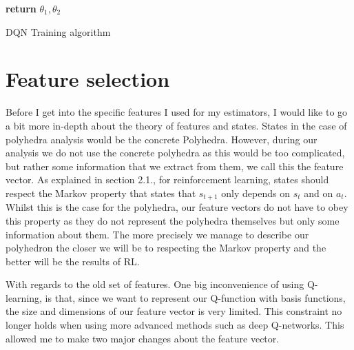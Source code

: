 \begin{center}
\begin{algorithm}[H]
{{     \Indm
     \Indp{}
		\Indm
	\Indp{}\Indm
	\Indp{}
			
    }
    
   }
   \textbf{return} $\theta_1,\theta_2$
    
\caption{DQN Training algorithm}
\end{algorithm}
\end{center}



\section{Feature selection}
Before I get into the specific features I used for my estimators, I would like to go a bit more in-depth about the theory of features and states. States in the case of polyhedra analysis would be the concrete Polyhedra. However, during our analysis we do not use the concrete polyhedra as this would be too complicated, but rather some information that we extract from them, we call this the feature vector. As explained in section 2.1., for reinforcement learning, states should respect the Markov property that states that $s_{t+1}$ only depends on $s_t$ and on $a_t$. Whilst this is the case for the polyhedra, our feature vectors do not have to obey this property as they do not represent the polyhedra themselves but only some information about them. The more precisely we manage to describe our polyhedron the closer we will be to respecting the Markov property and the better will be the results of RL. 

With regards to the old set of features. One big inconvenience of using Q-learning, is that, since we want to represent our Q-function with basis functions, the size and dimensions of our feature vector is very limited. This constraint no longer holds when using more advanced methods such as deep Q-networks. This allowed me to make two major changes about the feature vector. 
